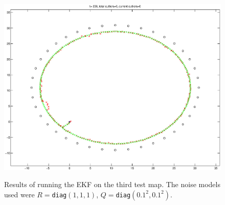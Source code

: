 \documentclass[a4paper,12pt]{article}
\begin{document}
\begin{figure}
{{      \includegraphics[width=.43\textwidth]{figures/ekf/map3_batch_motion}
    }
    \label{fig:m3batch}
  }
  
  \caption{Results of running the EKF on the third test map. The noise models
    used were $R=$\texttt{diag}$(1, 1, 1)$, $Q=$\texttt{diag}$(0.1^2,
    0.1^2)$.}
  \label{fig:map3}
\end{figure}
\end{document}
